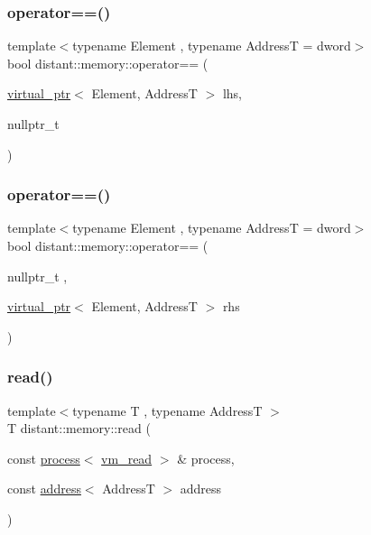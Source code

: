 \subsubsection{\texorpdfstring{operator==()}{operator==()}\hspace{0.1cm}{\footnotesize\ttfamily [1/2]}}
{\footnotesize\ttfamily template$<$typename Element , typename AddressT  = dword$>$ \\
bool distant\+::memory\+::operator== (\begin{DoxyParamCaption}\item[{\mbox{\hyperlink{classdistant_1_1memory_1_1virtual__ptr}{virtual\+\_\+ptr}}$<$ Element, AddressT $>$}]{lhs,  }\item[{nullptr\+\_\+t}]{ }\end{DoxyParamCaption})}

\mbox{\label{namespacedistant_1_1memory_a8b98e15c5d137dd94c604799bce5279a}} 
\subsubsection{\texorpdfstring{operator==()}{operator==()}\hspace{0.1cm}{\footnotesize\ttfamily [2/2]}}
{\footnotesize\ttfamily template$<$typename Element , typename AddressT  = dword$>$ \\
bool distant\+::memory\+::operator== (\begin{DoxyParamCaption}\item[{nullptr\+\_\+t}]{,  }\item[{\mbox{\hyperlink{classdistant_1_1memory_1_1virtual__ptr}{virtual\+\_\+ptr}}$<$ Element, AddressT $>$}]{rhs }\end{DoxyParamCaption})}

\mbox{\label{namespacedistant_1_1memory_a5a24d0d196510d8789b81010723809e9}} 
\subsubsection{\texorpdfstring{read()}{read()}\hspace{0.1cm}{\footnotesize\ttfamily [1/2]}}
{\footnotesize\ttfamily template$<$typename T , typename AddressT $>$ \\
T distant\+::memory\+::read (\begin{DoxyParamCaption}\item[{const \mbox{\hyperlink{classdistant_1_1kernel__objects_1_1process}{process}}$<$ \mbox{\hyperlink{namespacedistant_a671e87e004e808bfc0d54a4e816981df}{vm\+\_\+read}} $>$ \&}]{process,  }\item[{const \mbox{\hyperlink{classdistant_1_1memory_1_1address}{address}}$<$ AddressT $>$}]{address }\end{DoxyParamCaption})}

